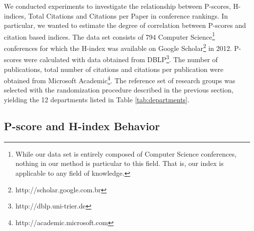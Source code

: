\documentclass[notitlepage]{svjour3}
\begin{document}
We conducted experiments to investigate the relationship between P-scores, H-indices, Total Citations
and Citations per Paper in conference rankings. In particular, we wanted to estimate the degree of correlation 
between P-scores and citation based indices. The data set consists of 794
Computer Science\footnote{
While our data set is entirely composed of Computer Science conferences, nothing in our method is
particular to this field. That is, our index is applicable to any field of knowledge.
} 
conferences
for which the H-index was available on Google Scholar\footnote{http://scholar.google.com.br}
in 2012. P-scores were calculated with
data obtained from DBLP\footnote{http://dblp.uni-trier.de}. The number of publications,
total number of citations and citations per publication were obtained from Microsoft
Academic\footnote{http://academic.microsoft.com}.
The reference set of research groups
was selected with the randomization procedure described in the previous section, 
yielding the 12 departments listed in Table \ref{tab:departments}.


\subsection{P-score and H-index Behavior}
\end{document}
